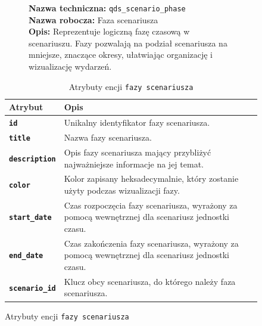 \begin{figure}[H]
    \begin{minipage}{\textwidth}
        \centering
        \begin{figure}[H]
            \centering
            \begin{minipage}{0.8\textwidth}
                \begin{framed}
                    \noindent\textbf{\large Nazwa techniczna:} \texttt{qds\_scenario\_phase} \\
                    \textbf{\large Nazwa robocza:} Faza scenariusza \\
                    \textbf{\large Opis:} Reprezentuje logiczną fazę czasową w scenariuszu.
                    Fazy pozwalają na podział scenariusza na mniejsze, znaczące okresy, ułatwiając organizację i wizualizację wydarzeń.
                \end{framed}
            \end{minipage}
        \end{figure}

        \begin{table}[H]
            \centering
            \renewcommand{\arraystretch}{1.6}
            \begin{tabular}{|>{\bfseries}l|p{}|}
                \hline
                \rowcolor[HTML]{EFEFEF} \textbf{Atrybut} & \textbf{Opis} \\
                \hline
                \texttt{id} & Unikalny identyfikator fazy scenariusza. \\
                \hline
                \texttt{title} & Nazwa fazy scenariusza. \\
                \hline
                \texttt{description} & Opis fazy scenariusza mający przybliżyć najważniejsze informacje na jej temat. \\
                \hline
                \texttt{color} & Kolor zapisany heksadecymalnie, który zostanie użyty podczas wizualizacji fazy. \\
                \hline
                \texttt{start\_date} & Czas rozpoczęcia fazy scenariusza, wyrażony za pomocą wewnętrznej dla scenariusz jednostki czasu. \\
                \hline
                \texttt{end\_date} & Czas zakończenia fazy scenariusza, wyrażony za pomocą wewnętrznej dla scenariusz jednostki czasu. \\
                \hline
                \texttt{scenario\_id} & Klucz obcy scenariusza, do którego należy faza scenariusza. \\
                \hline
            \end{tabular}
            \caption{Atrybuty encji \texttt{fazy scenariusza}}
        \end{table}
    \end{minipage}
\end{figure}

